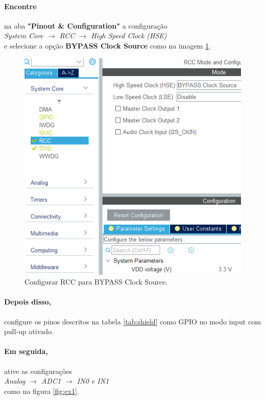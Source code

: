 \documentclass[a4paper,twocolumn,twoside,11pt]{article}
\begin{document}
\paragraph{Encontre} na aba \textbf{"Pinout \& Configuration"} a configuração\\ \textit{System Core $\rightarrow$ RCC $\rightarrow$ High Speed Clock (HSE)}\\ e selecione a opção \textbf{BYPASS Clock Source} como na imagem \ref{fig:ex0}.

\begin{figure}[H]
  \centering
  \includegraphics[width=0.8\linewidth]{0_cube_RCC_HSE.png}
  \caption{Configurar RCC para BYPASS Clock Source.}
  \label{fig:ex0}
\end{figure}

\paragraph{Depois disso,} configure os pinos descritos na tabela \ref{tab:shield} como GPIO no modo input com pull-up ativado.

\paragraph{Em seguida,} ative as configurações\\ \textit{Analog $\rightarrow$ ADC1 $\rightarrow$ IN0 e IN1}\\como na figura \ref{fig:ex1}.
\end{document}
